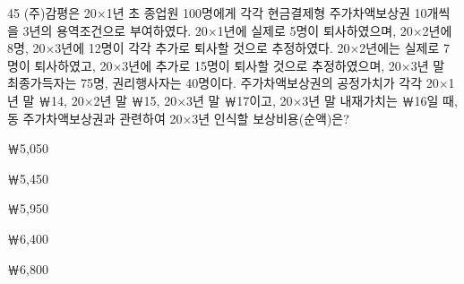 \begin{question}{45}
(주)감평은 20×1년 초 종업원 100명에게 각각 현금결제형 주가차액보상권 10개씩을 3년의 용역조건으로 부여하였다. 20×1년에 실제로 5명이 퇴사하였으며, 20×2년에 8명, 20×3년에 12명이 각각 추가로 퇴사할 것으로 추정하였다. 20×2년에는 실제로 7명이 퇴사하였고, 20×3년에 추가로 15명이 퇴사할 것으로 추정하였으며, 20×3년 말 최종가득자는 75명, 권리행사자는 40명이다. 주가차액보상권의 공정가치가 각각 20×1년 말 ￦14, 20×2년 말 ￦15, 20×3년 말 ￦17이고, 20×3년 말 내재가치는 ￦16일 때, 동 주가차액보상권과 관련하여 20×3년 인식할 보상비용(순액)은?
\begin{choices}
  \item ￦5,050
  \item ￦5,450
  \item ￦5,950
  \item ￦6,400
  \item ￦6,800
\end{choices}
\end{question}
